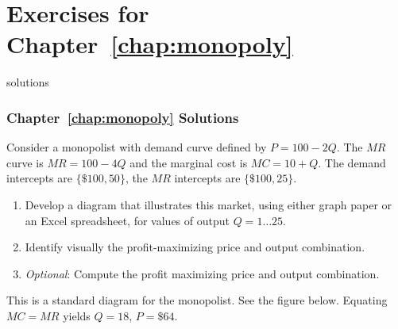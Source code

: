 \newpage
\section*{Exercises for Chapter~\ref{chap:monopoly}}

\begin{Filesave}{solutions}
\subsubsection*{Chapter~\ref{chap:monopoly} Solutions}
\end{Filesave}

\begin{enumialphparenastyle}

\begin{econex}\label{ex:ch10ex1}
Consider a monopolist with demand curve defined by $P=100-2Q$. The $MR$ curve is $MR=100-4Q$ and the marginal cost is $MC=10+Q$. The demand intercepts are $\{\$100,50\}$, the $MR$ intercepts are $\{\$100,25\}$.
\begin{enumerate}
\item	Develop a diagram that illustrates this market, using either graph paper or an Excel spreadsheet, for values of output $Q=1\ldots25$.
\item	Identify visually the profit-maximizing price and output combination.
\item	\textit{Optional}: Compute the profit maximizing price and output combination.
\end{enumerate}
\begin{econsolution}
This is a standard diagram for the monopolist. See the figure below. Equating $MC=MR$ yields $Q=18$, $P=\$64$.

\begin{center*}
\end{center*}
\end{econsolution}
\end{econex}


\end{enumialphparenastyle}
